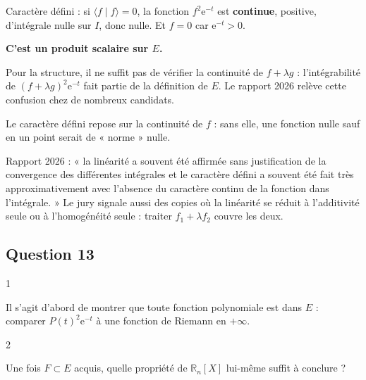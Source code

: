 \documentclass[11pt,a4paper]{article}
\begin{document}
Caractère défini : si \(\langle f\mid f\rangle=0\), la fonction \(f^2\mathrm e^{-t}\) est \textbf{continue}, positive, d'intégrale nulle sur \(I\), donc nulle. Et \(f=0\) car \(\mathrm e^{-t}>0\).

\textbf{C'est un produit scalaire sur \(E\).}

\begin{piege}

Pour la structure, il ne suffit pas de vérifier la continuité de \(f+\lambda g\) : l'intégrabilité de \((f+\lambda g)^2\mathrm e^{-t}\) fait partie de la définition de \(E\). Le rapport 2026 relève cette confusion chez de nombreux candidats.

\end{piege}

\begin{piege}

Le caractère défini repose sur la continuité de \(f\) : sans elle, une fonction nulle sauf en un point serait de « norme » nulle.

\end{piege}

\begin{jury}

Rapport 2026 : « la linéarité a souvent été affirmée sans justification de la convergence des différentes intégrales et le caractère défini a souvent été fait très approximativement avec l'absence du caractère continu de la fonction dans l'intégrale. » Le jury signale aussi des copies où la linéarité se réduit à l'additivité seule ou à l'homogénéité seule : traiter \(f_1+\lambda f_2\) couvre les deux.

\end{jury}

\hypertarget{question-13}{%
\subsection{Question 13}\label{question-13}}

\begin{indication}{1}

Il s'agit d'abord de montrer que toute fonction polynomiale est dans \(E\) : comparer \(P(t)^2\mathrm e^{-t}\) à une fonction de Riemann en \(+\infty\).

\end{indication}

\begin{indication}{2}

Une fois \(F\subset E\) acquis, quelle propriété de \(\mathbb R_n[X]\) lui-même suffit à conclure ?

\end{indication}
\end{document}
